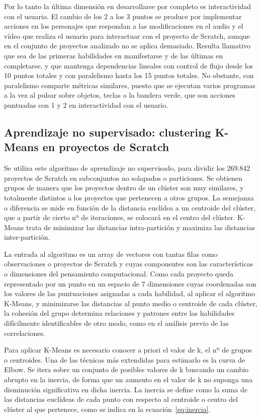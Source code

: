\documentclass[a4paper, 12pt]{book}
\begin{document}
Por lo tanto la última dimensión en desarrollarse por completo es interactividad con el usuario. El cambio de los 2 a los 3 puntos se produce por implementar acciones en los personajes que respondan a las modificaciones en el audio y el vídeo que realiza el usuario para interactuar con el proyecto de Scratch, aunque en el conjunto de proyectos analizado no se aplica demasiado. Resulta llamativo que sea de las primeras habilidades en manifestarse y de las últimas en completarse, y que mantenga dependencias lineales con control de flujo desde los 10 puntos totales %
y con paralelismo hasta los 15 puntos totales. No obstante, con paralelismo comparte métricas similares, puesto que se ejecutan varios programas a la vez al pulsar sobre objetos, teclas o la bandera verde, que son acciones puntuadas con 1 y 2 en interactividad con el usuario. 

\subsection{Aprendizaje no supervisado: clustering K-Means en proyectos de Scratch}
\label{subsec:kmeans_Scratch}

Se utiliza este algoritmo de aprendizaje no supervisado, para dividir los 269.842 proyectos de Scratch en subconjuntos no solapados o particiones. Se obtienen grupos de manera que los proyectos dentro de un clúster son muy similares, y totalmente distintos a los proyectos que pertenecen a otros grupos. La semejanza o diferencia se mide en función de la distancia euclídea a un centroide del clúster, que a partir de cierto nº de iteraciones, se colocará en el centro del clúster. K-Means trata de minimizar las distancias intra-partición y maximiza las distancias inter-partición.

La entrada al algoritmo es un array de vectores con tantas filas como observaciones o proyectos de Scratch y cuyas componentes son las características o dimensiones del pensamiento computacional. Como cada proyecto queda representado por un punto en un espacio de 7 dimensiones cuyas coordenadas son los valores de las puntuaciones asignadas a cada habilidad, al aplicar el algoritmo K-Means, y minimizarse las distancias al punto medio o centroide de cada clúster, la cohesión del grupo determina relaciones y patrones entre las habilidades difícilmente identificables de otro modo, como en el análisis previo de las correlaciones. 

Para aplicar K-Means es necesario conocer a priori el valor de k, el nº de grupos o centroides. Una de las técnicas más extendidas para estimarlo es la curva de Elbow. Se itera sobre un conjunto de posibles valores de k buscando un cambio abrupto en la inercia, de forma que un aumento en el valor de k no suponga una disminución significativa en dicha inercia. La inercia se define como la suma de las distancias euclídeas de cada punto con respecto al centroide o centro del clúster al que pertenece, como se indica en la ecuación~\eqref{eq:inercia}.
\end{document}

